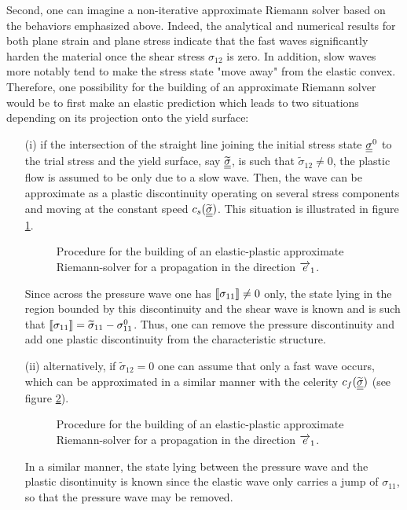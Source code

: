 Second, one can imagine a non-iterative approximate Riemann solver based on the behaviors emphasized above.
Indeed, the analytical and numerical results for both plane strain and plane stress indicate that the fast waves significantly harden the material once the shear stress $\sigma_{12}$ is zero.
In addition, slow waves more notably tend to make the stress state "move away" from the elastic convex.
Therefore, one possibility for the building of an approximate Riemann solver would be to first make an elastic prediction which leads to two situations depending on its projection onto the yield surface:
\begin{itemize}
\item[(i)] if the intersection of the straight line joining the initial stress state ${\underline{\underline{\sigma}}}^0$ to the trial stress and the yield surface, say $\widetilde{{\underline{\underline{\sigma}}}}$, is such that $\widetilde{\sigma}_{12}\neq 0$, the plastic flow is assumed to be only due to a slow wave.
  Then, the wave can be approximate as a plastic discontinuity operating on several stress components and moving at the constant speed $c_s(\widetilde{{\underline{\underline{\sigma}}}})$.
  This situation is illustrated in figure \ref{fig:approx_RP_EP_slow}.
  \begin{figure}[h!]
    \centering
    
    \caption{Procedure for the building of an elastic-plastic approximate Riemann-solver for a propagation in the direction ${\overrightarrow{e}}_1$.}
    \label{fig:approx_RP_EP_slow}
  \end{figure}
  Since across the pressure wave one has $\llbracket \sigma_{11} \rrbracket\neq 0$ only, the state lying in the region bounded by this discontinuity and the shear wave is known and is such that  $\llbracket \sigma_{11} \rrbracket = \widetilde{\sigma}_{11}-\sigma_{11}^0$.
  Thus, one can remove the pressure discontinuity and add one plastic discontinuity from the characteristic structure.
  
\item[(ii)] alternatively, if $\widetilde{\sigma}_{12}= 0$ one can assume that only a fast wave occurs, which can be approximated in a similar manner with the celerity $c_f(\widetilde{{\underline{\underline{\sigma}}}})$ (see figure \ref{fig:approx_RP_EP_fast}).
  \begin{figure}[h!]
    \centering
    
    \caption{Procedure for the building of an elastic-plastic approximate Riemann-solver for a propagation in the direction ${\overrightarrow{e}}_1$.}
    \label{fig:approx_RP_EP_fast}
  \end{figure}
  In a similar manner, the state lying between the pressure wave and the plastic disontinuity is known since the elastic wave only carries a jump of $\sigma_{11}$, so that the pressure wave may be removed.
\end{itemize}

